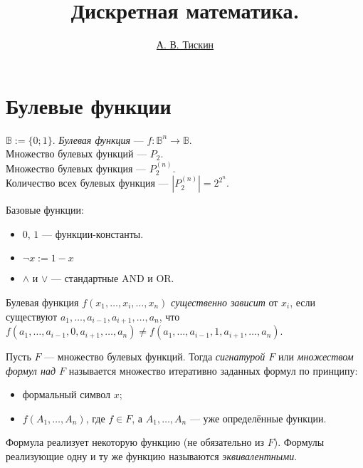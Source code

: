 \documentclass[12pt,a4paper]{article}
\title{Дискретная математика.}
\author{\href{mailto:alextiskin@gmail.com}{А. В. Тискин}}
\date{}
\newcommand{\BB}[1][]{\ensuremath{\mathbb{B}#1}\xspace}
\begin{document}
    \maketitle

    \tableofcontents

    \section{Булевые функции}

    \begin{definition}
        $\BB := \{0; 1\}$. \emph{Булевая функция} --- $f: \BB^n \to \BB$.\\
        Множество булевых функций --- $P_2$.\\
        Множество булевых функция --- $P^{(n)}_2$.\\
        Количество всех булевых функция --- $\left|P^{(n)}_2\right|=2^{2^n}$.
    \end{definition}

    \begin{definition}
        Базовые функции:
        \begin{itemize}
            \item $0$, $1$ --- функции-константы.
            \item $\neg x := 1-x$
            \item $\wedge$ и $\vee$ --- стандартные AND и OR. 
        \end{itemize}
    \end{definition}

    \begin{definition}
        Булевая функция $f(x_1, \dots, x_i, \dots, x_n)$ \emph{существенно зависит} от $x_i$, если существуют $a_1, \dots, a_{i-1}, a_{i+1}, \dots, a_n$, что $f(a_1, \dots, a_{i-1}, 0, a_{i+1}, \dots, a_n) \neq f(a_1, \dots, a_{i-1}, 1, a_{i+1}, \dots, a_n)$.
    \end{definition}

    \begin{definition}
        Пусть $F$ --- множество булевых функций. Тогда \emph{сигнатурой $F$} или \emph{множеством формул над $F$} называется множество итеративно заданных формул по принципу:
        \begin{itemize}
            \item формальный символ $x$;
            \item $f(A_1, \dots, A_n)$, где $f\in F$, а $A_1, \dots, A_n$ --- уже определённые функции.
        \end{itemize}

        Формула реализует некоторую функцию (не обязательно из $F$). Формулы реализующие одну и ту же функцию называются \emph{эквивалентными}.
    \end{definition}
\end{document}
